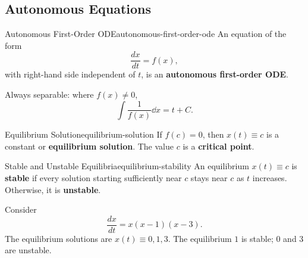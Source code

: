 \subsection{Autonomous Equations}

\begin{definition}{Autonomous First-Order ODE}{autonomous-first-order-ode}
  An equation of the form
  \[
    \frac{dx}{dt}=f(x),
  \]
  with right-hand side independent of $t$, is an \textbf{autonomous first-order ODE}.
\end{definition}

Always separable: where $f(x)\ne0$,
\[
  \int\frac{1}{f(x)}\dd{x}=t+C.
\]

\begin{definition}{Equilibrium Solution}{equilibrium-solution}
  If $f(c)=0$, then $x(t)\equiv c$ is a constant or \textbf{equilibrium solution}.
  The value $c$ is a \textbf{critical point}.
\end{definition}

\begin{definition}{Stable and Unstable Equilibria}{equilibrium-stability}
  An equilibrium $x(t)\equiv c$ is \textbf{stable} if every solution starting
  sufficiently near $c$ stays near $c$ as $t$ increases. Otherwise, it is \textbf{unstable}.
\end{definition}

\begin{example}
  Consider
  \[
    \frac{dx}{dt}=x(x-1)(x-3).
  \]
  The equilibrium solutions are $x(t)\equiv0,1,3$.
  The equilibrium $1$ is stable; $0$ and $3$ are unstable.
  \begin{center}
  \end{center}
\end{example}

